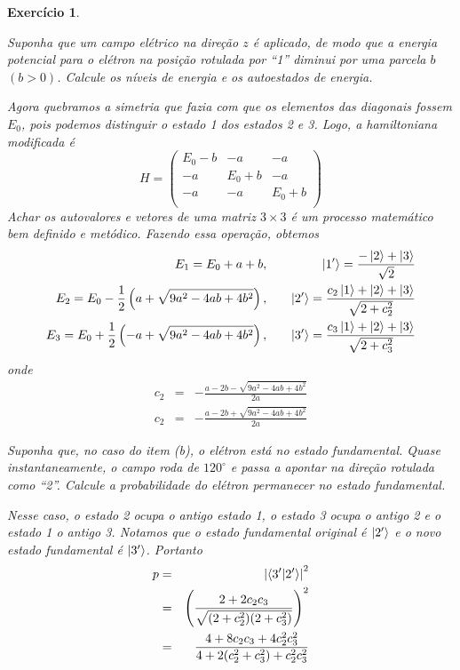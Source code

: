 \documentclass[12pt]{article}
\def\be{\begin{equation}}
\def\ee{\end{equation}}
\def\bea{\begin{eqnarray*}}
\def\eea{\end{eqnarray*}}
\def\f{\frac}
\def\l{\left}
\def\r{\right}
\newtheorem{exercise}{Exercício}
\begin{document}
\begin{exercise}
\begin{exercises}
			\item Suponha que um campo elétrico na direção $z$ é aplicado, de modo que a energia potencial para o elétron na posição rotulada por “1” diminui por uma parcela $b$
			$(b>0)$. Calcule os níveis de energia e os autoestados de energia.
			\begin{multianswer}
				Agora quebramos a simetria que fazia com que os elementos das diagonais fossem $E_0$, pois podemos distinguir o estado 1 dos estados 2 e 3. Logo, a hamiltoniana modificada é 
				\be
				H = 
				\begin{pmatrix}
					E_0 - b & -a & -a \\
					-a & E_0 + b & -a \\
					-a & -a & E_0 + b \\
				\end{pmatrix}
				\ee
				Achar os autovalores e vetores de uma matriz $3\times3$ é um processo matemático bem definido e metódico. Fazendo essa operação, obtemos
				\bea
					E_1 = E_0 + a + b, &\quad& \ket{1'} = \f{-\ket{2} + \ket{3}}{\sqrt{2}} \\
					E_2 = E_0 - \f{1}{2}\l( a + \sqrt{9a^2 - 4ab + 4b^2}\r), &\quad& \ket{2'} = \f{c_2\ket{1} +\ket{2} + \ket{3}}{\sqrt{2+c_2^2}} \\
					E_3 = E_0 + \f{1}{2}\l( -a + \sqrt{9a^2 - 4ab + 4b^2}\r), &\quad& \ket{3'} = \f{c_3\ket{1} +\ket{2} + \ket{3}}{\sqrt{2+c_3^2}}
				\eea
				onde
				\bea
					c_2 &=& - \f{a -2b - \sqrt{9a^2 -4ab + 4b^2}}{2a} \\					c_2 &=& - \f{a -2b + \sqrt{9a^2 -4ab + 4b^2}}{2a} 
				\eea
			\end{multianswer}
		
			\item Suponha que, no caso do item (b), o elétron está no estado fundamental.
			Quase instantaneamente, o campo roda de $120^\circ$ e passa a apontar na direção
			rotulada como “2”. Calcule a probabilidade do elétron permanecer no estado fundamental.
			\begin{multianswer}[true]
				Nesse caso, o estado 2 ocupa o antigo estado 1, o estado 3 ocupa o antigo 2 e o estado 1 o antigo 3. Notamos que o estado fundamental original é $\ket{2'}$ e o novo estado fundamental é $\ket{3'}$. Portanto
				\bea
					p &=& \l| \braket{3' | 2'} \r|^2 \\
						&=& \l(\f{2 + 2c_2c_3}{\sqrt{(2+c_2^2)(2+c_3^2)}}\r)^2 \\
						&=& \f{4 + 8c_2c_3 + 4c_2^2c_3^2}{4 + 2(c_2^2+c_3^2)+c_2^2c_3^2}
				\eea
			\end{multianswer}
			
		\end{exercises}
	\end{exercise}
	
\end{document}
